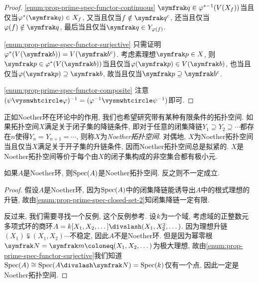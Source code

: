\begin{proof}
  \ref{enum:prop-prime-spec-functor-continuous} $\ideal{q}\in\varphi^{*-1}(V(X_f))$当且仅当$\varphi^*(\ideal{q})\in X_f$, 又当且仅当$f\notin \ideal{q}^c$, 还当且仅当$\varphi (f)\notin \ideal{q}$, 最后当且仅当$\ideal{q}\in Y_{\varphi (f)}$.

  \ref{enum:prop-prime-spec-functor-surjective} 只需证明$\varphi^*(V(\ideal{b}))=V(\ideal{b}^c)$. 考虑素理想$\ideal{p}\in X$, 则$\ideal{p}\in\varphi^*(V(\ideal{b}))$当且仅当$\varphi(\ideal{p})\in V(\ideal{b})$, 也当且仅当$\varphi(\ideal{p})\supseteq\ideal{b}$, 故当且仅当$\ideal{p}\supseteq\ideal{b}^c$.

  \ref{enum:prop-prime-spec-functor-composite} 注意$(\psi\composite\varphi)^{-1}=(\varphi^{-1}\composite\psi^{-1})$即可.
\end{proof}


正如Noether环在环论中的作用, 我们也希望研究带有某种有限条件的拓扑空间. 如果拓扑空间$X$满足关于闭子集的降链条件, 即对于任意的闭集降链$Y_1\supseteq Y_2\supseteq\dotsb$都存在$n$使得$Y_n=Y_{n+1}=\dotsb$, 则称$X$为\emph{Noether拓扑空间}. 对偶地, $X$为Noether拓扑空间当且仅当$X$满足关于开子集的升链条件, 因而Noether拓扑空间总是拟紧的. $X$是Noether拓扑空间等价于每个由$X$的闭子集构成的非空集合都有极小元.

\begin{proposition}
  如果$A$是Noether环, 则$\operatorname{Spec} (A)$是Noether拓扑空间. 反之则不一定成立.
\end{proposition}

\begin{proof}
  假设$A$是Noether环, 因为$\operatorname{Spec} (A)$中的闭集降链能诱导出$A$中的根式理想的升链, 故由\ref{enum:prop-prime-spec-closed-set-2}知闭集降链一定有限.

  反过来, 我们需要寻找一个反例, 这个反例参考. 设$k$为一个域, 考虑域的正整数元多项式环的商环$A=\kk [X_1, X_2, \dotsc]{\divslash}(X_1, X_2^2, \dotsc)$. 因为理想升链$(X_1)\subsetneqq (X_1, X_2)\dotsb$不稳定, 因此$A$不是Noether环. 但是因为幂零根$\nil=\ideal{m}\coloneq (X_1, X_2, \dotsc)$为极大理想, 故由\ref{enum:prop-prime-spec-functor-surjective}我们知道$\Spec (A)\cong\Spec (A{\divslash}\nil)=\Spec (\kk)$仅有一个点, 因此一定是Noether拓扑空间.
\end{proof}

